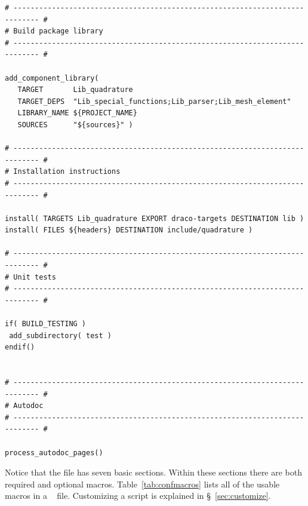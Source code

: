 \begin{description}
\begin{lstlisting}[basicstyle=\footnotesize, xleftmargin=0.0in, xrightmargin=0.0in,caption={\comp{CMakeLists.txt} file for the \pkg{quadrature} package.},label=lst:quadrature-cml,float=htp]
# ---------------------------------------------------------------------------- #
# Build package library
# ---------------------------------------------------------------------------- #

add_component_library( 
   TARGET       Lib_quadrature
   TARGET_DEPS  "Lib_special_functions;Lib_parser;Lib_mesh_element"
   LIBRARY_NAME ${PROJECT_NAME} 
   SOURCES      "${sources}" )

# ---------------------------------------------------------------------------- #
# Installation instructions
# ---------------------------------------------------------------------------- #

install( TARGETS Lib_quadrature EXPORT draco-targets DESTINATION lib )
install( FILES ${headers} DESTINATION include/quadrature )

# ---------------------------------------------------------------------------- #
# Unit tests
# ---------------------------------------------------------------------------- #

if( BUILD_TESTING )
 add_subdirectory( test )
endif()   
  

# ---------------------------------------------------------------------------- #
# Autodoc
# ---------------------------------------------------------------------------- #

process_autodoc_pages()
\end{lstlisting}

  Notice that the  file has seven basic sections.  Within
  these sections there are both required and optional macros.
  Table~\ref{tab:confmacros} lists all of the usable macros in a
  \draco\  file.  Customizing a  script is explained 
  in \S~\ref{sec:customize}.
  

\end{description}
